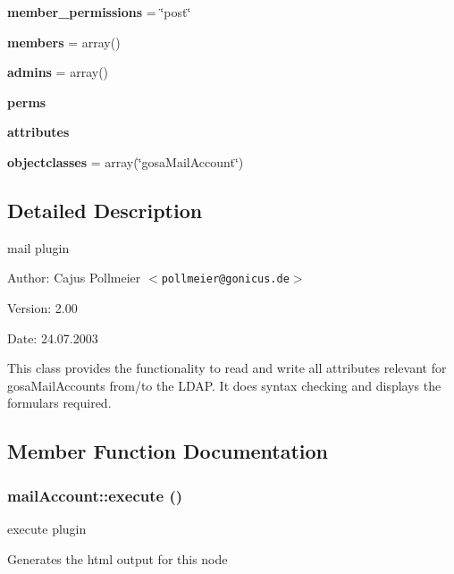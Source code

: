 \begin{CompactItemize}
\item 
{\bf member\_\-permissions} = \char`\"{}post\char`\"{}\label{classmailAccount_o15}

\item 
{\bf members} = array()\label{classmailAccount_o16}

\item 
{\bf admins} = array()\label{classmailAccount_o17}

\item 
{\bf perms}
\item 
{\bf attributes}
\item 
{\bf objectclasses} = array(\char`\"{}gosa\-Mail\-Account\char`\"{})\label{classmailAccount_o20}

\end{CompactItemize}


\subsection{Detailed Description}
mail plugin 

\begin{Desc}
\item[Author:]Cajus Pollmeier $<${\tt pollmeier@gonicus.de}$>$ \end{Desc}
\begin{Desc}
\item[Version:]2.00 \end{Desc}
\begin{Desc}
\item[Date:]24.07.2003\end{Desc}
This class provides the functionality to read and write all attributes relevant for gosa\-Mail\-Accounts from/to the LDAP. It does syntax checking and displays the formulars required. 



\subsection{Member Function Documentation}
\subsubsection{\setlength{\rightskip}{0pt plus 5cm}mail\-Account::execute ()}\label{classmailAccount_a4}


execute plugin 

Generates the html output for this node 

